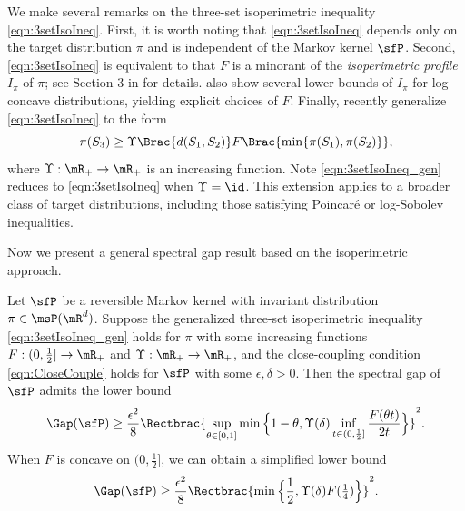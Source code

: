 \documentclass[11pt]{article}
\begin{document}
We make several remarks on the three-set isoperimetric inequality \eqref{eqn:3setIsoIneq}.
%
First, it is worth noting that \eqref{eqn:3setIsoIneq} depends only on the target distribution $\pi$ and is independent of the Markov kernel \(\sfP\).
%
Second, \eqref{eqn:3setIsoIneq} is equivalent to that $F$ is a minorant of the \emph{isoperimetric profile} $I_\pi$ of $\pi$; see Section 3 in \cite{24-AAP2058} for details.
\cite{24-AAP2058} also show several lower bounds of $I_\pi$ for log-concave distributions, yielding explicit choices of $F$.
%
Finally, \cite{goyal2025mixing} recently generalize \eqref{eqn:3setIsoIneq} to the form
\begin{equation}
\label{eqn:3setIsoIneq_gen}
    \pi(S_3) \ge \Upsilon \Brac{ d(S_1,S_2) }
    F \Brac{\min\{\pi(S_1),\pi(S_2)\}},
\end{equation}
where $\Upsilon:\mR_+\to\mR_+$ is an increasing function.
Note \eqref{eqn:3setIsoIneq_gen} reduces to \eqref{eqn:3setIsoIneq} when $\Upsilon = \id$.
This extension applies to a broader class of target distributions, including those satisfying Poincar\'e or log-Sobolev inequalities.



Now we present a general spectral gap result based on the isoperimetric approach.

\begin{prop}
\label{prop:SpecGap_via_Iso}
Let $\sfP$ be a reversible Markov kernel with invariant distribution $\pi \in \msP(\mR^d)$.
%
Suppose the generalized three-set isoperimetric inequality \eqref{eqn:3setIsoIneq_gen} holds for $\pi$ with some increasing functions $F:(0,\frac{1}{2}] \to \mR_+$ and $\Upsilon:\mR_+ \to \mR_+$, and the close-coupling condition \eqref{eqn:CloseCouple} holds for $\sfP$ with some $\epsilon,\delta>0$.
%
Then the spectral gap of $\sfP$ admits the lower bound
\begin{equation}
\label{eqn:SpecGap_via_Iso}
    \Gap(\sfP) \ge \frac{\epsilon^2}{8} \Rectbrac{ \sup_{\theta\in[0,1]} \min \Big\{ 1-\theta , \Upsilon(\delta) \inf_{t\in(0,\frac{1}{2}]} \frac{ F(\theta t) }{ 2t } \Big\} }^2.
\end{equation}
When $F$ is concave on $(0,\frac{1}{2}]$, we can obtain a simplified lower bound
\begin{equation}
\label{eqn:Gap_bound}
    \Gap(\sfP) \ge \frac{\epsilon^2}{8} \Rectbrac{ \min \Big\{ \frac{1}{2} , \Upsilon(\delta) F(\tfrac{1}{4}) \Big\} }^2.
\end{equation}
\end{prop}
\end{document}
